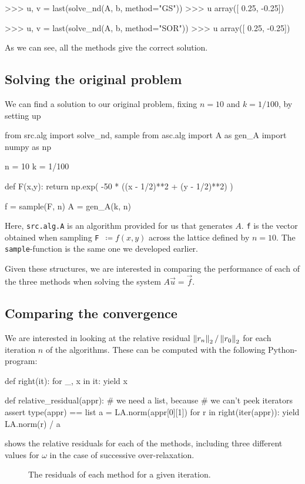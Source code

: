 \documentclass[12pt]{article}
\begin{document}
\begin{multicols}{2}
\begin{python}
>>> u, v = last(solve_nd(A, b, method="GS"))
>>> u
array([ 0.25, -0.25])

>>> u, v = last(solve_nd(A, b, method="SOR"))
>>> u
array([ 0.25, -0.25])
    \end{python}
    As we can see, all the methods give the correct solution.

    \subsection*{Solving the original problem}

    We can find a solution to our original problem,
    fixing $n = 10$ and $k = 1/100$, by setting up
    \begin{python}
from src.alg import solve_nd, sample
from asc.alg import A as gen_A
import numpy as np

n = 10
k = 1/100

def F(x,y):
    return np.exp(
        -50 * ((x - 1/2)**2 + (y - 1/2)**2)
    )

f = sample(F, n)
A = gen_A(k, n)
    \end{python}
    Here, {\tt src.alg.A} is an algorithm provided for us that generates $A$.
    {\tt f} is the vector obtained when sampling
    \mbox{{\tt F} $\coloneqq f(x, y)$} across the lattice defined by $n = 10$.
    The {\tt sample}-function is the same one we developed earlier.

    Given these structures, we are interested in comparing the performance of each of
    the three methods when solving the system $A \vec u = \vec f$.

    \subsection{Comparing the convergence}
    We are interested in looking at the relative residual
    $\Norm[2]{r_n} / \Norm[2]{r_0}$ for each iteration $n$ of the
    algorithms. These can be computed with the following Python-program:
    \begin{python}
def right(it):
    for _, x in it: yield x

def relative_residual(appr):
    # we need a list, because
    # we can't peek iterators
    assert type(appr) == list
    a = LA.norm(appr[0][1])
    for r in right(iter(appr)):
        yield LA.norm(r) / a
    \end{python}
     shows the relative residuals for each of the methods,
    including three different values for $\omega$ in the case of
    successive over-relaxation.
    \begin{figure}[H]
        \centering
        
        \caption{
            The residuals of each method for a given iteration.
        }
        \label{fig:residuals}
    \end{figure}\noindent





\end{multicols}
\end{document}
